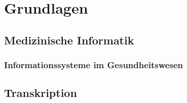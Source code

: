 \chapter{Grundlagen}\label{ch:preliminaries}

\section{Medizinische Informatik}
\subsection{Informationssysteme im Gesundheitswesen}

\section{Transkription}







